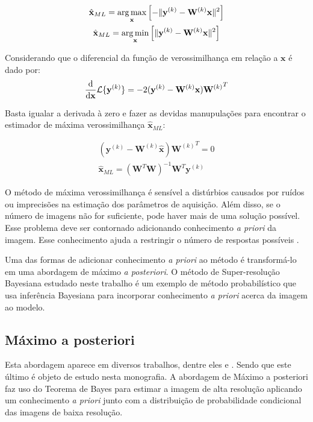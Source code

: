 \begin{gather}
	\label{eq:maxlhood}
	\hat{\mathbf{x}}_{ML} = \operatorname*{arg\,max}_{\mathbf{x}}
	\left[ - \|\mathbf{y}^{(k)} - \mathbf{W}^{(k)}\mathbf{x}\|^2 
	\right ] \\
	\hat{\mathbf{x}}_{ML} = \operatorname*{arg\,min}_{\mathbf{x}}
	\left[ \|\mathbf{y}^{(k)} - \mathbf{W}^{(k)}\mathbf{x}\|^2 
	\right ] 
\end{gather}


Considerando que o diferencial da função de verossimilhança em relação a $\mathbf{x}$ é dado por:
\begin{equation}
	\frac{\mathrm{d}}{\mathrm{d} \mathbf{x}}
	\mathcal{L}\{\mathbf{y}^{(k)}\} = -2 (\mathbf{y}^{(k)} - \mathbf{W}^{(k)}\mathbf{x}) {\mathbf{W}^{(k)}}^T \\
\end{equation}

Basta igualar a derivada à zero e fazer as devidas manupulações para encontrar o estimador de máxima verossimilhança $\hat{\mathbf{x}}_{ML}$: 

\begin{gather}
	(\mathbf{y}^{(k)} - \mathbf{W}^{(k)}\hat{\mathbf{x}}) {\mathbf{W}^{(k)}}^T = 0 \\
	\hat{\mathbf{x}}_{ML} = (\mathbf{W}^T\mathbf{W})^{-1} \mathbf{W}^T \mathbf{y}^{(k)}
\end{gather}

O método de máxima verossimilhança é sensível a distúrbios causados por ruídos ou
imprecisões na estimação dos parâmetros de aquisição.
Além disso, se o número de imagens não for suficiente, pode haver mais de uma solução
possível. Esse problema deve ser contornado adicionando conhecimento \emph{a priori} da
imagem.
Esse conhecimento ajuda a restringir o número de respostas possíveis \cite{nasrollahi2014super}.

Uma das formas de adicionar conhecimento \emph{a priori} ao método é transformá-lo em
uma abordagem de máximo \emph{a posteriori}.
O método de Super-resolução Bayesiana estudado neste trabalho é um exemplo de método probabilístico que usa inferência Bayesiana para incorporar conhecimento \emph{a priori} acerca da imagem ao modelo.

\subsection{Máximo a posteriori}
Esta abordagem aparece em diversos trabalhos, dentre eles \cite{pickup2007bayesian2,pickup2007bayesian} e \cite{tipping2003bayesian}.
Sendo que este último é objeto de estudo nesta monografia.
A abordagem de Máximo a posteriori faz uso do Teorema de Bayes para estimar a imagem
de alta resolução aplicando um 
conhecimento \emph{a priori} junto com a distribuição de probabilidade condicional
das imagens de baixa resolução.

